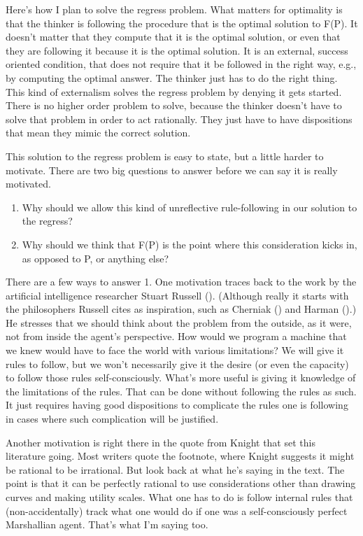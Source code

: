 \documentclass[
  12pt,
  letterpaper,
]{scrbook}
\providecommand{\tightlist}{%
  \setlength{\itemsep}{0pt}\setlength{\parskip}{0pt}}\usepackage{longtable,booktabs,array}
\begin{document}
Here's how I plan to solve the regress problem. What matters for
optimality is that the thinker is following the procedure that is the
optimal solution to F(P). It doesn't matter that they compute that it is
the optimal solution, or even that they are following it because it is
the optimal solution. It is an external, success oriented condition,
that does not require that it be followed in the right way, e.g., by
computing the optimal answer. The thinker just has to do the right
thing. This kind of externalism solves the regress problem by denying it
gets started. There is no higher order problem to solve, because the
thinker doesn't have to solve that problem in order to act rationally.
They just have to have dispositions that mean they mimic the correct
solution.

This solution to the regress problem is easy to state, but a little
harder to motivate. There are two big questions to answer before we can
say it is really motivated.

\begin{enumerate}
\def\labelenumi{\arabic{enumi}.}
\tightlist
\item
  Why should we allow this kind of unreflective rule-following in our
  solution to the regress?
\item
  Why should we think that F(P) is the point where this consideration
  kicks in, as opposed to P, or anything else?
\end{enumerate}

There are a few ways to answer 1. One motivation traces back to the work
by the artificial intelligence researcher Stuart Russell
(). (Although really it starts with the
philosophers Russell cites as inspiration, such as Cherniak
() and Harman
().) He stresses that we should think
about the problem from the outside, as it were, not from inside the
agent's perspective. How would we program a machine that we knew would
have to face the world with various limitations? We will give it rules
to follow, but we won't necessarily give it the desire (or even the
capacity) to follow those rules self-consciously. What's more useful is
giving it knowledge of the limitations of the rules. That can be done
without following the rules as such. It just requires having good
dispositions to complicate the rules one is following in cases where
such complication will be justified.

Another motivation is right there in the quote from Knight that set this
literature going. Most writers quote the footnote, where Knight suggests
it might be rational to be irrational. But look back at what he's saying
in the text. The point is that it can be perfectly rational to use
considerations other than drawing curves and making utility scales. What
one has to do is follow internal rules that (non-accidentally) track
what one would do if one was a self-consciously perfect Marshallian
agent. That's what I'm saying too.
\end{document}
